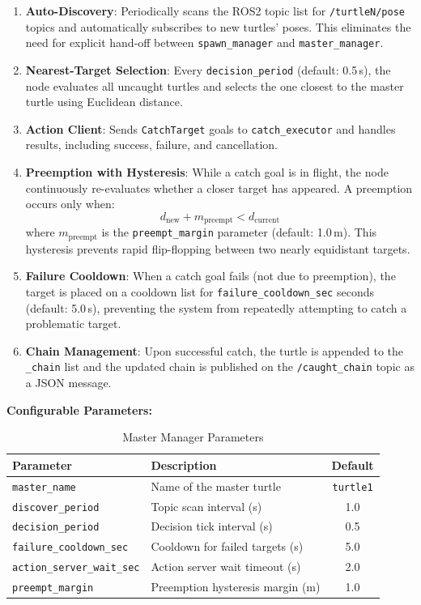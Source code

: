 \documentclass[12pt,a4paper]{article}
\begin{document}
\begin{enumerate}[label=\arabic*.]
  \item \textbf{Auto-Discovery}: Periodically scans the ROS2 topic list for \texttt{/turtleN/pose} topics and automatically subscribes to new turtles' poses. This eliminates the need for explicit hand-off between \texttt{spawn\_manager} and \texttt{master\_manager}.

  \item \textbf{Nearest-Target Selection}: Every \texttt{decision\_period} (default: 0.5\,s), the node evaluates all uncaught turtles and selects the one closest to the master turtle using Euclidean distance.

  \item \textbf{Action Client}: Sends \texttt{CatchTarget} goals to \texttt{catch\_executor} and handles results, including success, failure, and cancellation.

  \item \textbf{Preemption with Hysteresis}: While a catch goal is in flight, the node continuously re-evaluates whether a closer target has appeared. A preemption occurs only when:
  \[
    d_{\text{new}} + m_{\text{preempt}} < d_{\text{current}}
  \]
  where $m_{\text{preempt}}$ is the \texttt{preempt\_margin} parameter (default: 1.0\,m). This hysteresis prevents rapid flip-flopping between two nearly equidistant targets.

  \item \textbf{Failure Cooldown}: When a catch goal fails (not due to preemption), the target is placed on a cooldown list for \texttt{failure\_cooldown\_sec} seconds (default: 5.0\,s), preventing the system from repeatedly attempting to catch a problematic target.

  \item \textbf{Chain Management}: Upon successful catch, the turtle is appended to the \texttt{\_chain} list and the updated chain is published on the \texttt{/caught\_chain} topic as a JSON message.
\end{enumerate}

\textbf{Configurable Parameters:}

\begin{table}[H]
\centering
\caption{Master Manager Parameters}
\begin{tabular}{llc}
\toprule
\textbf{Parameter} & \textbf{Description} & \textbf{Default} \\
\midrule
\texttt{master\_name} & Name of the master turtle & \texttt{turtle1} \\
\texttt{discover\_period} & Topic scan interval (s) & 1.0 \\
\texttt{decision\_period} & Decision tick interval (s) & 0.5 \\
\texttt{failure\_cooldown\_sec} & Cooldown for failed targets (s) & 5.0 \\
\texttt{action\_server\_wait\_sec} & Action server wait timeout (s) & 2.0 \\
\texttt{preempt\_margin} & Preemption hysteresis margin (m) & 1.0 \\
\bottomrule
\end{tabular}
\end{table}
\end{document}
